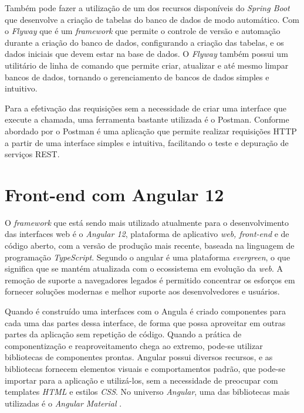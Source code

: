     Também pode fazer a utilização de um dos recursos disponíveis do \textit{Spring Boot} que desenvolve a criação de tabelas do banco de dados de modo automático. Com o \textit{Flyway} que é um \textit{framework} que permite o controle de versão e automação durante a criação do banco de dados, configurando a criação das tabelas, e os dados iniciais que devem estar na base de dados. O \textit{Flyway} também possui um utilitário de linha de comando que permite criar, atualizar e até mesmo limpar bancos de dados, tornando o gerenciamento de bancos de dados simples e intuitivo.

    Para a efetivação das requisições sem a necessidade de criar uma interface que execute a chamada, uma ferramenta bastante utilizada é o Postman. Conforme abordado por  o Postman é uma aplicação que permite realizar requisições HTTP a partir de uma interface simples e intuitiva, facilitando o teste e depuração de serviços REST.


\section{Front-end com Angular 12}

    O \textit{framework} que está sendo mais utilizado atualmente para o desenvolvimento das interfaces web é o \textit{Angular 12}, plataforma de aplicativo \textit{web, front-end} e de código aberto, com a versão de produção mais recente, baseada na linguagem  de programação \textit{TypeScript}. Segundo  o angular é uma plataforma \textit{evergreen}, o que significa que se mantém atualizada com o ecossistema em evolução da \textit{web}. A remoção de suporte a navegadores legados é permitido concentrar os esforços em fornecer soluções modernas e melhor suporte aos desenvolvedores e usuários.
    
    Quando é construído uma interfaces com o Angula é criado componentes para cada uma das partes dessa interface, de forma que possa aproveitar em outras partes da aplicação sem repetição de código. Quando a prática de componentização e reaproveitamento chega ao extremo, pode-se utilizar bibliotecas de componentes prontas. Angular possui diversos recursos, e as bibliotecas fornecem elementos visuais e comportamentos padrão, que pode-se importar para a aplicação e utilizá-los, sem a necessidade de preocupar com templates \textit{HTML} e estilos \textit{CSS}. No universo \textit{Angular}, uma das bibliotecas mais utilizadas é o \textit{Angular Material} \cite{noleto}.

